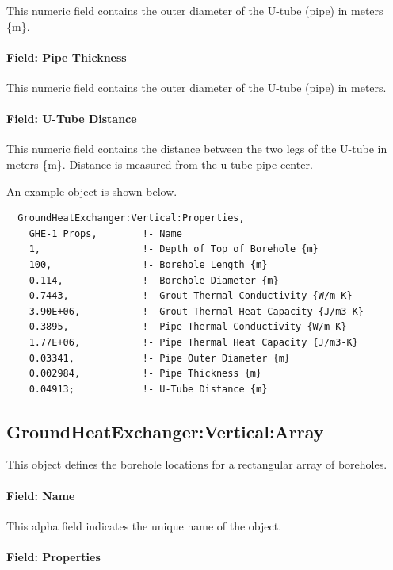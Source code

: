 This numeric field contains the outer diameter of the U-tube (pipe) in meters \{m\}.

\paragraph{Field: Pipe Thickness}\label{field-pipe-thickness-000}

This numeric field contains the outer diameter of the U-tube (pipe) in meters.

\paragraph{Field: U-Tube Distance}\label{field-u-tube-distance}

This numeric field contains the distance between the two legs of the U-tube in meters \{m\}. Distance is measured from the u-tube pipe center.

An example object is shown below.

\begin{lstlisting}
  GroundHeatExchanger:Vertical:Properties,
    GHE-1 Props,        !- Name
    1,                  !- Depth of Top of Borehole {m}
    100,                !- Borehole Length {m}
    0.114,              !- Borehole Diameter {m}
    0.7443,             !- Grout Thermal Conductivity {W/m-K}
    3.90E+06,           !- Grout Thermal Heat Capacity {J/m3-K}
    0.3895,             !- Pipe Thermal Conductivity {W/m-K}
    1.77E+06,           !- Pipe Thermal Heat Capacity {J/m3-K}
    0.03341,            !- Pipe Outer Diameter {m}
    0.002984,           !- Pipe Thickness {m}
    0.04913;            !- U-Tube Distance {m}
\end{lstlisting}

\subsection{GroundHeatExchanger:Vertical:Array}\label{groundheatexchangerverticalarray}

This object defines the borehole locations for a rectangular array of boreholes.

\paragraph{Field: Name}

This alpha field indicates the unique name of the object.

\paragraph{Field: Properties}

